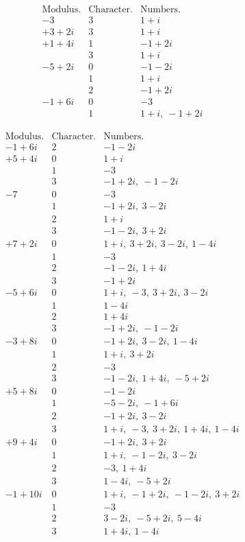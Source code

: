 \[
\begin{array}{r|c|l}
\text{Modulus.}&\text{Character.}&\text{Numbers.}\\\hline
-3&3&1+i\\
+3+2i&3&1+i\\
+1+4i&1&-1+2i\\
&3&1+i\\
-5+2i&0&-1-2i\\
&1&1+i\\
&2&-1+2i\\
-1+6i&0&-3\\
&1&1+i,\ -1+2i
\end{array}
\]

%
\[
\begin{array}{r|c|l}
\text{Modulus.}&\text{Character.}&\text{Numbers.}\\\hline
-1+6i&2&-1-2i\\
+5+4i&0&1+i\\
&1&-3\\
&3&-1+2i,\ -1-2i\\
-7&0&-3\\
&1&-1+2i,\ 3-2i\\
&2&1+i\\
&3&-1-2i,\ 3+2i\\
+7+2i&0&1+i,\ 3+2i,\ 3-2i,\ 1-4i\\
&1&-3\\
&2&-1-2i,\ 1+4i\\
&3&-1+2i\\
-5+6i&0&1+i,\ -3,\ 3+2i,\ 3-2i\\
&1&1-4i\\
&2&1+4i\\
&3&-1+2i,\ -1-2i\\
-3+8i&0&-1+2i,\ 3-2i,\ 1-4i\\
&1&1+i,\ 3+2i\\
&2&-3\\
&3&-1-2i,\ 1+4i,\ -5+2i\\
+5+8i&0&-1-2i\\
&1&-5-2i,\ -1+6i\\
&2&-1+2i,\ 3-2i\\
&3&1+i,\ -3,\ 3+2i,\ 1+4i,\ 1-4i\\
+9+4i&0&-1+2i,\ 3+2i\\
&1&1+i,\ -1-2i,\ 3-2i\\
&2&-3,\ 1+4i\\
&3&1-4i,\ -5+2i\\
-1+10i&0&1+i,\ -1+2i,\ -1-2i,\ 3+2i\\
&1&-3\\
&2&3-2i,\ -5+2i,\ 5-4i\\
&3&1+4i,\ 1-4i
\end{array}
\]


